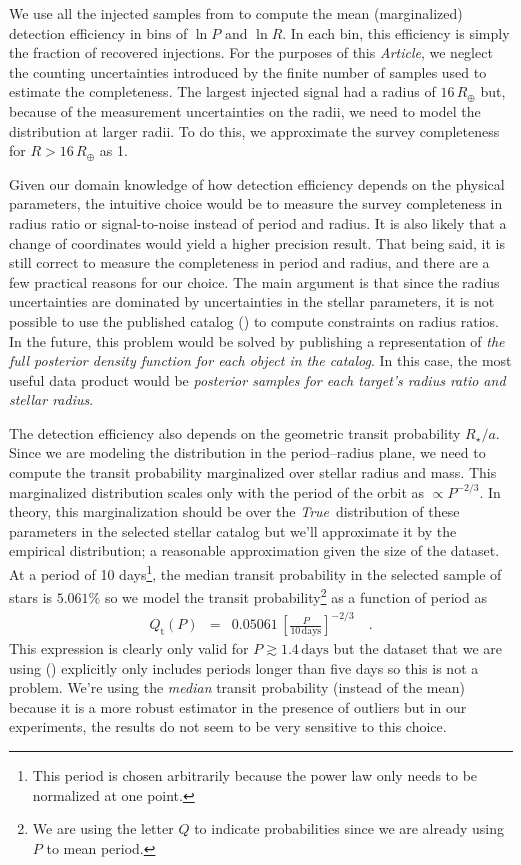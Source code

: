 \documentclass[12pt,preprint]{aastex}
\newcommand{\paper}{\textsl{Article}}
\newcommand{\foreign}[1]{\emph{#1}}
\newcommand{\True}{\foreign{True}}
\newcommand{\radius}{\ensuremath{R}}
\newcommand{\period}{\ensuremath{P}}
\newcommand{\transitprob}{{\ensuremath{Q_\mathrm{t}}}}
\begin{document}
We use all the injected samples from \citet{petigura} to compute the mean
(marginalized) detection efficiency in bins of $\ln\period$ and $\ln\radius$.
In each bin, this efficiency is simply the fraction of recovered injections.
For the purposes of this \paper, we neglect the counting uncertainties
introduced by the finite number of samples used to estimate the completeness.
The largest injected signal had a radius of $16\,R_\oplus$ but, because of the
measurement uncertainties on the radii, we need to model the distribution at
larger radii.
To do this, we approximate the survey completeness for $\radius>16\,R_\oplus$
as 1.

Given our domain knowledge of how detection efficiency depends on the physical
parameters, the intuitive choice would be to measure the survey completeness
in radius ratio or signal-to-noise instead of period and radius.
It is also likely that a change of coordinates would yield a higher precision
result.
That being said, it is still correct to measure the completeness in period and
radius, and there are a few practical reasons for our choice.
The main argument is that since the radius uncertainties are dominated by
uncertainties in the stellar parameters, it is not possible to use the
published catalog (\citealt{petigura}) to compute constraints on radius
ratios.
In the future, this problem would be solved by publishing a representation of
\emph{the full posterior density function for each object in the catalog}.
In this case, the most useful data product would be \emph{posterior samples
for each target's radius ratio and stellar radius}.

The detection efficiency also depends on the geometric transit probability
$R_\star/a$.
Since we are modeling the distribution in the period--radius plane, we need to
compute the transit probability marginalized over stellar radius and mass.
This marginalized distribution scales only with the period of the orbit as
$\propto \period^{-2/3}$.
In theory, this marginalization should be over the \True\ distribution of
these parameters in the selected stellar catalog but we'll approximate it by
the empirical distribution; a reasonable approximation given the size of the
dataset.
At a period of 10 days\footnote{This period is chosen arbitrarily because the
power law only needs to be normalized at one point.}, the median transit
probability in the selected sample of stars is $5.061\%$ so we model the
transit probability\footnote{We are using the letter $Q$ to indicate
probabilities since we are already using $P$ to mean period.} as a function of
period as
\begin{eqnarray}
\transitprob (\period) &=&
    0.05061\,\left[\frac{\period}{10\,\mathrm{days}}\right]^{-2/3} \quad.
\end{eqnarray}
This expression is clearly only valid for $\period \gtrsim 1.4\,\mathrm{days}$
but the dataset that we are using (\citealt{petigura}) explicitly only
includes periods longer than five days so this is not a problem.
We're using the \emph{median} transit probability (instead of the mean)
because it is a more robust estimator in the presence of outliers but in our
experiments, the results do not seem to be very sensitive to this choice.
\end{document}
